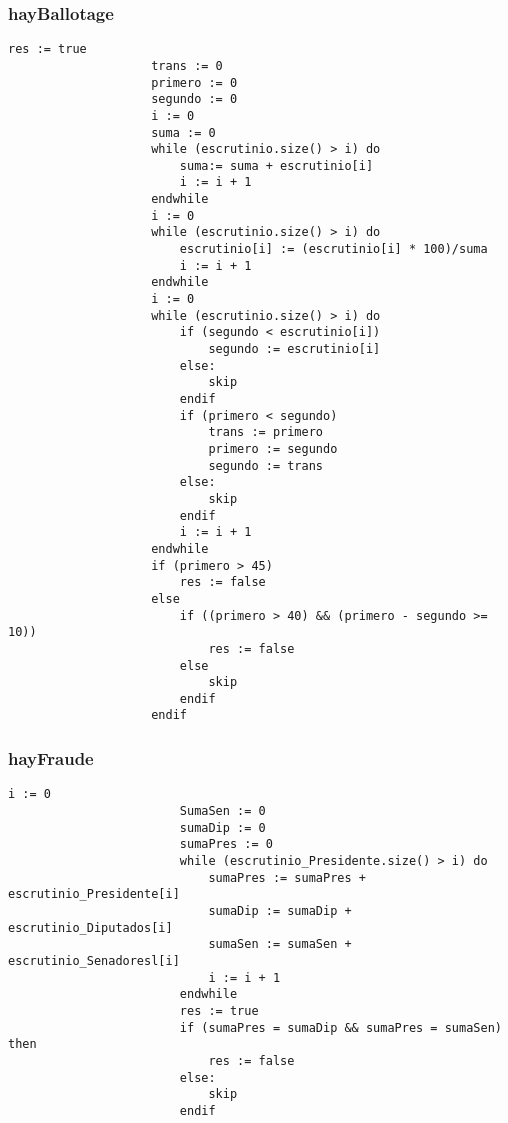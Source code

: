 \documentclass[10pt,a4paper]{article}
\begin{document}
		\subsubsection{hayBallotage}
			\begin{minipage}[t]{\textwidth}
				\begin{lstlisting}[caption={()},label=code:for]
					res := true
					trans := 0
					primero := 0
					segundo := 0
					i := 0
					suma := 0
					while (escrutinio.size() > i) do
						suma:= suma + escrutinio[i]
						i := i + 1
					endwhile
					i := 0
					while (escrutinio.size() > i) do
						escrutinio[i] := (escrutinio[i] * 100)/suma
						i := i + 1
					endwhile
					i := 0
					while (escrutinio.size() > i) do 
						if (segundo < escrutinio[i])
							segundo := escrutinio[i]
						else:
							skip
						endif
						if (primero < segundo)
							trans := primero
							primero := segundo
							segundo := trans
						else:
							skip
						endif
						i := i + 1
					endwhile
					if (primero > 45)
						res := false
					else
						if ((primero > 40) && (primero - segundo >= 10))
							res := false
						else
							skip
						endif
					endif

				\end{lstlisting}
			\end{minipage}

		\subsubsection{hayFraude}
			\begin{minipage}[t]{\textwidth}
				\begin{lstlisting}[caption={()},label=code:for]
						i := 0
						SumaSen := 0
						sumaDip := 0
						sumaPres := 0
						while (escrutinio_Presidente.size() > i) do
							sumaPres := sumaPres + escrutinio_Presidente[i]
							sumaDip := sumaDip + escrutinio_Diputados[i]
							sumaSen := sumaSen + escrutinio_Senadoresl[i]
							i := i + 1
						endwhile
						res := true
						if (sumaPres = sumaDip && sumaPres = sumaSen) then 
							res := false
						else:
							skip
						endif
				\end{lstlisting}
			\end{minipage}
\end{document}
